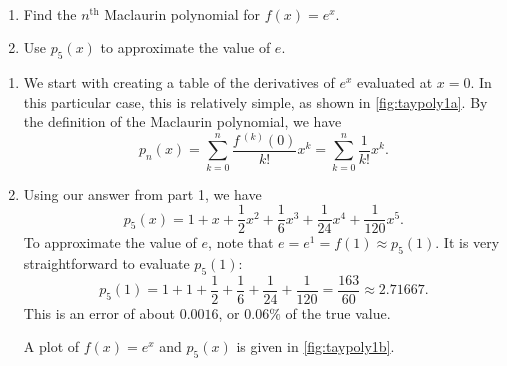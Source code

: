 \begin{example}\label{ex_taypoly1}
\mbox{}\\[-2\baselineskip]\parbox[t]{\linewidth}{%
\begin{enumerate}
	\item	Find the $n^\text{th}$ Maclaurin polynomial for $f(x) = e^x$.
	\item	Use $p_5(x)$ to approximate the value of $e$.
\end{enumerate}}\vspace{0pt}
\solution
{}
\begin{enumerate}
\item We start with creating a table of the derivatives of $e^x$ evaluated at $x=0$. In this particular case, this is relatively simple, as shown in \autoref{fig:taypoly1a}. By the definition of the Maclaurin polynomial, we have 
\[
	p_n(x)
	=\sum_{k=0}^n\frac{f\,^{(k)}(0)}{k!}x^k
	=\sum_{k=0}^n\frac1{k!}x^k.
\]

\item	Using our answer from part 1, we have
\[p_5(x) = 1+x+\frac{1}{2}x^2+\frac{1}{6}x^3 + \frac{1}{24}x^4 + \frac{1}{120}x^5.\]
To approximate the value of $e$, note that $e = e^1 = f(1) \approx p_5(1).$ It is very straightforward to evaluate $p_5(1)$:
%
%
\[p_5(1) = 1+1+\frac12+\frac16+\frac1{24}+\frac1{120} = \frac{163}{60} \approx 2.71667.\]
This is an error of about $0.0016$, or $0.06\%$ of the true value.

A plot of $f(x)=e^x$ and $p_5(x)$ is given in \autoref{fig:taypoly1b}.
\end{enumerate}
\end{example}

